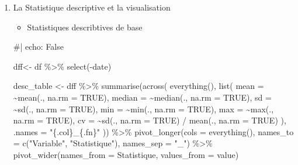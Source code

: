 \documentclass[
  letterpaper,
  DIV=11,
  numbers=noendperiod]{scrartcl}
\newenvironment{Shaded}{\begin{snugshade}}{\end{snugshade}}
\newcommand{\AttributeTok}[1]{\textcolor[rgb]{0.40,0.45,0.13}{#1}}
\newcommand{\CommentTok}[1]{\textcolor[rgb]{0.37,0.37,0.37}{#1}}
\newcommand{\ConstantTok}[1]{\textcolor[rgb]{0.56,0.35,0.01}{#1}}
\newcommand{\FunctionTok}[1]{\textcolor[rgb]{0.28,0.35,0.67}{#1}}
\newcommand{\NormalTok}[1]{\textcolor[rgb]{0.00,0.23,0.31}{#1}}
\newcommand{\OtherTok}[1]{\textcolor[rgb]{0.00,0.23,0.31}{#1}}
\newcommand{\SpecialCharTok}[1]{\textcolor[rgb]{0.37,0.37,0.37}{#1}}
\newcommand{\StringTok}[1]{\textcolor[rgb]{0.13,0.47,0.30}{#1}}
\providecommand{\tightlist}{%
  \setlength{\itemsep}{0pt}\setlength{\parskip}{0pt}}\usepackage{longtable,booktabs,array}
\begin{document}
\begin{enumerate}
\def\labelenumi{\arabic{enumi}.}
\item
  La Statistique descriptive et la visualisation

  \begin{itemize}
  \tightlist
  \item
    Statistiques describtives de base
  \end{itemize}

\begin{Shaded}
\begin{Highlighting}[]
\CommentTok{\#| echo: False}

\NormalTok{dff}\OtherTok{\textless{}{-}}\NormalTok{  df }\SpecialCharTok{\%\textgreater{}\%}
  \FunctionTok{select}\NormalTok{(}\SpecialCharTok{{-}}\NormalTok{date)}

\NormalTok{desc\_table }\OtherTok{\textless{}{-}}\NormalTok{ dff }\SpecialCharTok{\%\textgreater{}\%}
  \FunctionTok{summarise}\NormalTok{(}\FunctionTok{across}\NormalTok{(}
    \FunctionTok{everything}\NormalTok{(),}
    \FunctionTok{list}\NormalTok{(}
      \AttributeTok{mean =} \SpecialCharTok{\textasciitilde{}}\FunctionTok{mean}\NormalTok{(., }\AttributeTok{na.rm =} \ConstantTok{TRUE}\NormalTok{),}
      \AttributeTok{median =} \SpecialCharTok{\textasciitilde{}}\FunctionTok{median}\NormalTok{(., }\AttributeTok{na.rm =} \ConstantTok{TRUE}\NormalTok{),}
      \AttributeTok{sd =} \SpecialCharTok{\textasciitilde{}}\FunctionTok{sd}\NormalTok{(., }\AttributeTok{na.rm =} \ConstantTok{TRUE}\NormalTok{),}
      \AttributeTok{min =} \SpecialCharTok{\textasciitilde{}}\FunctionTok{min}\NormalTok{(., }\AttributeTok{na.rm =} \ConstantTok{TRUE}\NormalTok{),}
      \AttributeTok{max =} \SpecialCharTok{\textasciitilde{}}\FunctionTok{max}\NormalTok{(., }\AttributeTok{na.rm =} \ConstantTok{TRUE}\NormalTok{),}
      \AttributeTok{cv =} \SpecialCharTok{\textasciitilde{}}\FunctionTok{sd}\NormalTok{(., }\AttributeTok{na.rm =} \ConstantTok{TRUE}\NormalTok{) }\SpecialCharTok{/} \FunctionTok{mean}\NormalTok{(., }\AttributeTok{na.rm =} \ConstantTok{TRUE}\NormalTok{)}
\NormalTok{    ),}
    \AttributeTok{.names =} \StringTok{"\{.col\}\_\{.fn\}"}
\NormalTok{  )) }\SpecialCharTok{\%\textgreater{}\%}
  \FunctionTok{pivot\_longer}\NormalTok{(}\AttributeTok{cols =} \FunctionTok{everything}\NormalTok{(), }\AttributeTok{names\_to =} \FunctionTok{c}\NormalTok{(}\StringTok{"Variable"}\NormalTok{, }\StringTok{"Statistique"}\NormalTok{), }\AttributeTok{names\_sep =} \StringTok{"\_"}\NormalTok{) }\SpecialCharTok{\%\textgreater{}\%}
  \FunctionTok{pivot\_wider}\NormalTok{(}\AttributeTok{names\_from =}\NormalTok{ Statistique, }\AttributeTok{values\_from =}\NormalTok{ value)}


\end{Highlighting}
\end{Shaded}
\end{enumerate}
\end{document}
